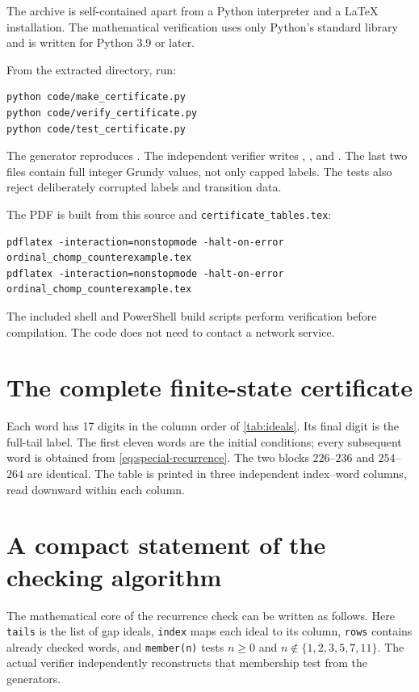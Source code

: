 \documentclass[11pt,letterpaper]{article}
\numberwithin{equation}{section}
\theoremstyle{definition}
\begin{document}
The archive is self-contained apart from a Python interpreter and a LaTeX
installation. The mathematical verification uses only Python's standard
library and is written for Python 3.9 or later.

From the extracted directory, run:
\begin{lstlisting}[language={},basicstyle=\ttfamily\small]
python code/make_certificate.py
python code/verify_certificate.py
python code/test_certificate.py
\end{lstlisting}
The generator reproduces . The independent
verifier writes ,
, and
. The last two files contain full integer
Grundy values, not only capped labels. The tests also reject deliberately
corrupted labels and transition data.

The PDF is built from this source and \texttt{certificate\_tables.tex}:
\begin{lstlisting}[language={},basicstyle=\ttfamily\small]
pdflatex -interaction=nonstopmode -halt-on-error ordinal_chomp_counterexample.tex
pdflatex -interaction=nonstopmode -halt-on-error ordinal_chomp_counterexample.tex
\end{lstlisting}
The included shell and PowerShell build scripts perform verification before
compilation. The code does not need to contact a network service.

\appendix
\section{The complete finite-state certificate}
\label{app:certificate}

Each word has 17 digits in the column order of \cref{tab:ideals}.
Its final digit is the full-tail label. The first eleven words are the
initial conditions; every subsequent word is obtained from
\cref{eq:special-recurrence}. The two blocks $226$--$236$ and $254$--$264$
are identical. The table is printed in three independent index--word
columns, read downward within each column.



\section{A compact statement of the checking algorithm}
\label{app:algorithm}

The mathematical core of the recurrence check can be written as follows.
Here \texttt{tails} is the list of gap ideals, \texttt{index} maps each ideal
to its column, \texttt{rows} contains already checked words, and
\texttt{member(n)} tests $n\geq0$ and $n\notin\{1,2,3,5,7,11\}$.
The actual verifier independently reconstructs that membership test from
the generators.
\end{document}

